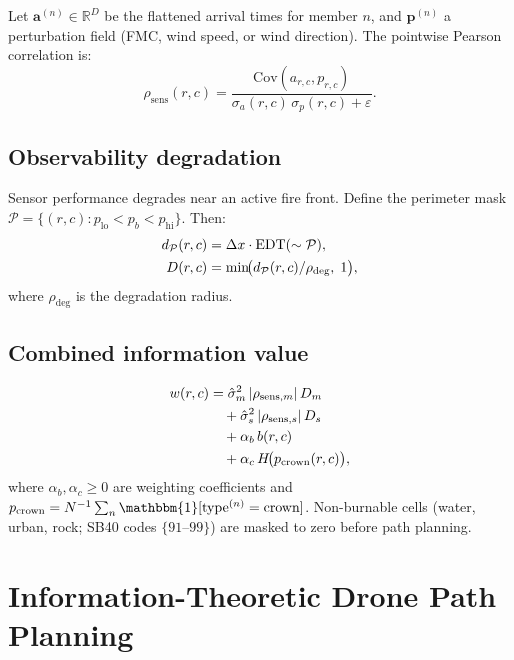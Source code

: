 \documentclass[11pt,twocolumn]{article}
\newcommand{\R}{\mathbb{R}}
\begin{document}
Let $\mathbf{a}^{(n)}\in\R^D$ be the flattened arrival times for
member $n$, and $\mathbf{p}^{(n)}$ a perturbation field (FMC, wind
speed, or wind direction).  The pointwise Pearson correlation is:
\begin{equation}
  \rho_{\mathrm{sens}}(r,c) = \frac{\mathrm{Cov}(a_{r,c},p_{r,c})}
    {\sigma_a(r,c)\,\sigma_p(r,c)+\varepsilon}.\label{eq:sens}
\end{equation}

\subsection{Observability degradation}

Sensor performance degrades near an active fire front.  Define the
perimeter mask $\mathcal{P}=\{(r,c): p_{\mathrm{lo}}<p_b<p_{\mathrm{hi}}\}$.
Then:
\begin{align}
  d_{\mathcal{P}}(r,c) &= \Delta x\cdot\mathrm{EDT}(\sim\mathcal{P}),\notag\\
  D(r,c) &= \min\!\bigl(d_{\mathcal{P}}(r,c)/\rho_{\mathrm{deg}},\;1\bigr),
  \label{eq:obs}
\end{align}
where $\rho_{\mathrm{deg}}$ is the degradation radius.

\subsection{Combined information value}

\begin{align}
  w(r,c) &= \hat{\sigma}^2_{m}\,|\rho_{\mathrm{sens},m}|\,D_m \notag\\
          &\quad + \hat{\sigma}^2_{s}\,|\rho_{\mathrm{sens},s}|\,D_s \notag\\
          &\quad + \alpha_b\,b(r,c) \notag\\
          &\quad + \alpha_c\,H\!\bigl(p_{\mathrm{crown}}(r,c)\bigr),\label{eq:w}
\end{align}
where $\alpha_b,\alpha_c\ge0$ are weighting coefficients and
$p_{\mathrm{crown}}=N^{-1}\sum_n\mathbbm{1}[\text{type}^{(n)}=\text{crown}]$.
Non-burnable cells (water, urban, rock; SB40 codes $\{91$--$99\}$) are
masked to zero before path planning.

\section{Information-Theoretic Drone Path Planning}
\label{sec:planning}
\end{document}
